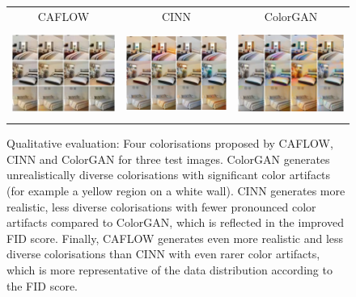 \begin{figure}[h!]
        \begin{center}
        \setlength{\tabcolsep}{3pt}
        \begin{tabular}{ccc}
        CAFLOW & CINN \cite{ardizzone2019guided} & ColorGAN \cite{colorGAN}  \\
        \includegraphics[height=2.9cm]{Chapter1/paper_graphs/colourisation/CAFLOW_borders.png}&
        \includegraphics[height=2.9cm]{Chapter1/paper_graphs/colourisation/CINN.png}&
        \includegraphics[height=2.9cm]{Chapter1/paper_graphs/colourisation/colorGAN.png}\\
        \end{tabular}
        \caption{Qualitative evaluation: Four colorisations proposed by CAFLOW, CINN and ColorGAN for three test images. ColorGAN generates unrealistically diverse colorisations with significant color artifacts (for example a yellow region on a white wall). CINN generates more realistic, less diverse colorisations with fewer pronounced color artifacts compared to ColorGAN, which is reflected in the improved FID score. Finally, CAFLOW generates even more realistic and less diverse colorisations than CINN with even rarer color artifacts, which is more representative of the data distribution according to the FID score.}
        \label{ch1:fig:colorisation-paper-visuals-results}
        \end{center}
\end{figure}

